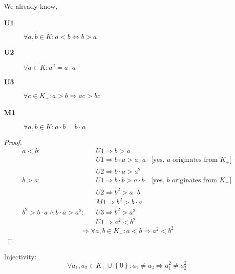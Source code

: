 \documentclass[a4paper]{article}
\theoremstyle{definition}
\newcommand\set[1]{\left\{#1\right\}}
\begin{document}
We already know,
\begin{description}
  \item[\textbf{U1}] $\forall a, b \in K: a < b \Leftrightarrow b > a$
  \item[\textbf{U2}] $\forall a \in K: a^2 = a\cdot a$
  \item[\textbf{U3}] $\forall c \in K_+: a > b \Rightarrow ac > bc$
  \item[\textbf{M1}] $\forall a, b \in K: a \cdot b = b \cdot a$
\end{description}

\begin{proof}
  \begin{align*}
    a < b: \hspace{10pt}
      & U1 \Rightarrow b > a \\
      & U1 \Rightarrow b\cdot a > a\cdot a & \text{[yes, $a$ originates from $K_+$]} \\
      & U2 \Rightarrow b\cdot a > a^2 \\
    b > a: \hspace{10pt}
      & U1 \Rightarrow b\cdot b > a\cdot b & \text{[yes, $b$ originates from $K_+$]} \\
      & U2 \Rightarrow b^2 > a\cdot b \\
      & M1 \Rightarrow b^2 > b\cdot a \\
    b^2 > b\cdot a \land b\cdot a > a^2: \hspace{10pt}
      & U3 \Rightarrow b^2 > a^2 \\
      & U1 \Rightarrow a^2 < b^2
  \end{align*}
  \[ \Rightarrow \forall a, b \in K_+: a < b \Rightarrow a^2 < b^2 \]
\end{proof}

Injectivity:
\[ \forall a_1, a_2 \in K_+ \cup \set{0}: a_1 \neq a_2 \Rightarrow a_1^2 \neq a_2^2 \]
\end{document}
